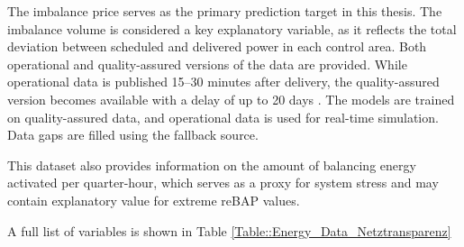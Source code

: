 \documentclass[class=scrbook, crop=false]{standalone}
\begin{document}
The imbalance price serves as the primary prediction target in this thesis. The imbalance volume is considered a key explanatory variable, as it reflects the total deviation between scheduled and delivered power in each control area.
Both operational and quality-assured versions of the data are provided. While operational data is published 15–30 minutes after delivery, the quality-assured version becomes available with a delay of up to 20 days \cite{NetztransparenzNRVSaldo}. The models are trained on quality-assured data, and operational data is used for real-time simulation. Data gaps are filled using the fallback source.

 This dataset also provides information on the amount of balancing energy activated per quarter-hour, which serves as a proxy for system stress and may contain explanatory value for extreme reBAP values.
 
A full list of variables is shown in Table \ref{Table::Energy_Data_Netztransparenz}




\end{document}
